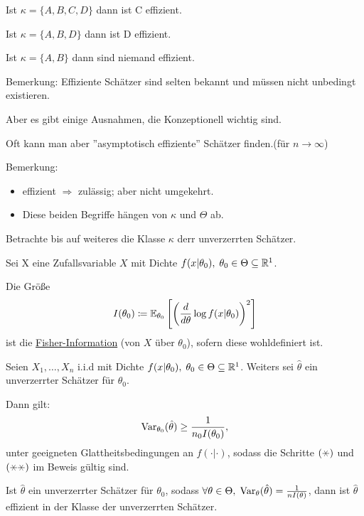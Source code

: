 \documentclass{tstextbook}
\begin{document}
Ist $\kappa= \{ A,B,C,D \}$ dann ist C effizient.

Ist $\kappa= \{ A,B,D \}$ dann ist D effizient.

Ist $\kappa= \{ A,B \}$ dann sind niemand effizient.

\begin{remark}
	Bemerkung: Effiziente Schätzer sind selten bekannt und müssen nicht unbedingt existieren.
	
	Aber es gibt einige Ausnahmen, die Konzeptionell wichtig sind.
	
	Oft kann man aber ''asymptotisch effiziente'' Schätzer finden.(für $n \rightarrow \infty  $)
\end{remark}

\begin{remark}
	Bemerkung:
	\begin{itemize}
		\item effizient $ \Rightarrow $ zulässig; aber nicht umgekehrt.
		\item Diese beiden Begriffe hängen von $\kappa$ und $\Theta$ ab.
	\end{itemize}
\end{remark}

Betrachte bis auf weiteres die Klasse $\kappa$ derr unverzerrten Schätzer.

\begin{definition}
	Sei X eine Zufallsvariable $ X $ mit Dichte $ f(x|\theta_0), \; \theta_0\in\Theta\subseteq\mathbb R^1 $.
	
	Die Größe 
	\[
	I(\theta_0) \coloneqq \mathbb E_{\theta_{0}} \left[\left(\frac{d}{d\theta}\log f(x|\theta_0)\right)^2\right]	
	\] ist die \underline{Fisher-Information}  (von $ X $ über $ \theta_0 $), sofern diese wohldefiniert ist.
\end{definition}

\begin{satz} 
	Seien $ X_1,\ldots,X_n $ i.i.d mit Dichte $ f(x|\theta_0), \; \theta_0\in\Theta\subseteq\mathbb R^1 $. Weiters sei $ \hat{\theta} $ ein unverzerrter Schätzer für $ \theta_0 $. 
	
	Dann gilt: \[
	\operatorname{Var}_{\theta_0} (\hat{\theta}) \ge \frac{1}{n_0 I(\theta_0)},
	\] 
	unter geeigneten Glattheitsbedingungen an $ f(\cdot|\cdot) $, sodass die Schritte $ (\hexstar) $ und $ (\hexstar\hexstar) $ im Beweis gültig sind.
\end{satz}

\begin{corollary}
	Ist $ \hat{\theta} $ ein unverzerrter Schätzer für $ \theta_0 $, sodass $ \forall\theta\in\Theta,\; \operatorname{Var}_\theta (\hat{\theta}) = \frac{1}{nI(\theta)} $, dann ist $\hat{\theta}$ effizient in der Klasse der unverzerrten Schätzer.
\end{corollary}
\end{document}
